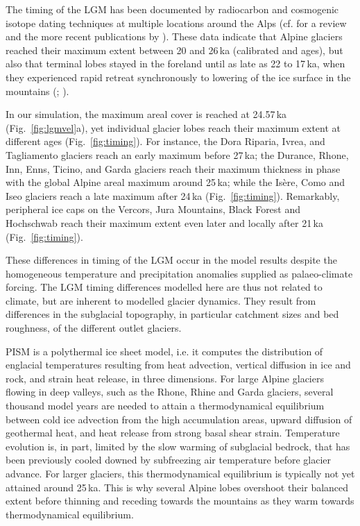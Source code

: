\documentclass[tc, manuscript]{copernicus}
\begin{document}
    The timing of the LGM has been documented by radiocarbon and cosmogenic
    isotope dating techniques at multiple locations around the Alps (cf.
    \citealp[Fig.~5]{Wirsig.etal.2016} for a review and the more recent
    publications by \citealp{Monegato.etal.2017, Federici.etal.2017}). These
    data indicate that Alpine glaciers reached their maximum extent between 20
    and 26\,ka (calibrated  and  ages), but also
    that terminal lobes stayed in the foreland until as late as 22 to 17\,ka,
    when they experienced rapid retreat synchronously to lowering of the ice
    surface in the mountains (\citealp[Fig.~5]{Wirsig.etal.2016};
    \citealp[Fig.~3]{Monegato.etal.2017}).

    In our simulation, the maximum areal cover is reached at 24.57\,ka
    (Fig.~\ref{fig:lgmvel}a), yet individual glacier lobes reach their
    maximum extent at different ages (Fig.~\ref{fig:timing}). For instance, the
    Dora Riparia, Ivrea, and Tagliamento glaciers reach an early maximum before
    27\,ka; the Durance, Rhone, Inn, Enns, Ticino, and Garda glaciers reach
    their maximum thickness in phase with the global Alpine areal maximum
    around 25\,ka; while the Isère, Como and Iseo glaciers reach a late maximum
    after 24\,ka (Fig.~\ref{fig:timing}). Remarkably, peripheral ice caps on
    the Vercors, Jura Mountains, Black Forest and Hochschwab reach their
    maximum extent even later and locally after 21\,ka (Fig.~\ref{fig:timing}).

    These differences in timing of the LGM occur in the model results despite
    the homogeneous temperature and precipitation anomalies supplied as
    palaeo-climate forcing. The LGM timing differences modelled here are
    thus not related to climate, but are inherent to modelled glacier dynamics.
    They result from differences in the subglacial topography, in particular
    catchment sizes and bed roughness, of the different outlet glaciers.

    PISM is a polythermal ice sheet model, i.e. it computes the distribution
    of englacial temperatures resulting from heat advection, vertical
    diffusion in ice and rock, and strain heat release, in three dimensions.
    For large Alpine glaciers flowing in deep valleys, such as the Rhone,
    Rhine and Garda glaciers, several thousand model years are needed to attain
    a thermodynamical equilibrium between cold ice advection from the high
    accumulation areas, upward diffusion of geothermal heat, and heat release
    from strong basal shear strain. Temperature evolution is, in part, limited
    by the slow warming of subglacial bedrock, that has been previously cooled
    downed by subfreezing air temperature before glacier advance.
    For larger glaciers, this thermodynamical equilibrium is typically not yet
    attained around 25\,ka. This is why several Alpine lobes overshoot their
    balanced extent before thinning and receding towards the mountains as they
    warm towards thermodynamical equilibrium.
\end{document}
